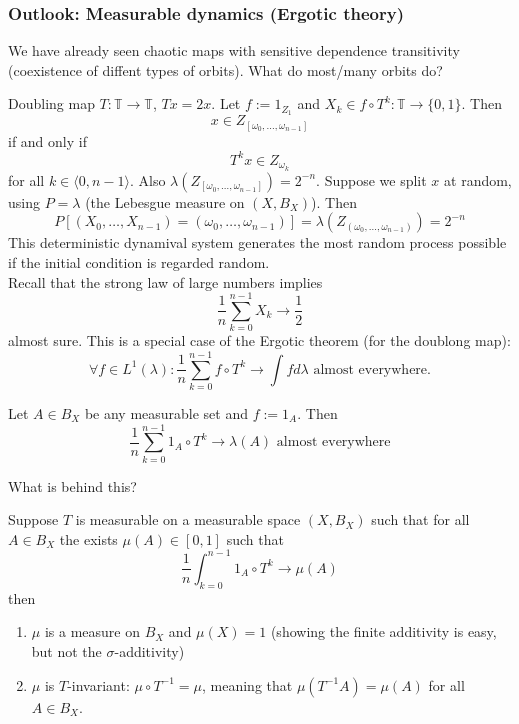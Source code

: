 \documentclass{article}
\newcommand*{\T}{\mathbb{T}}
\newcommand*{\half}[1]{\frac{#1}{2}}
\newcommand*{\jbr}[1]{{\langle #1 \rangle}}
\newcommand*{\og}{\omega}
\newcommand*{\reci}[1]{{\frac{1}{#1}}}
\begin{document}
\subsubsection{Outlook: Measurable dynamics (Ergotic theory)}

We have already seen chaotic maps with sensitive dependence transitivity (coexistence of diffent types of orbits). What do most/many orbits do?

\begin{exam}
    Doubling map $T:\T\to\T$, $Tx = 2x$. Let $f:= 1_{Z_1}$ and $X_k \in f\circ T^k:\T\to\{0,1\}$. Then
    $$x \in Z_{[\og_0,\dots,\og_{n-1}]}$$
    if and only if
    $$T^kx\in Z_{\og_k}$$
    for all $k \in\jbr{0,n-1}$. Also $\lambda(Z_{[\omega_0,\dots,\og_{n-1}]})=2^{-n}$. Suppose we split $x$ at random, using $P = \lambda$ (the Lebesgue measure on $(X, B_X)$). Then
    $$P[(X_0,\dots,X_{n-1})=(\og_0,\dots,\omega_{n-1})]=\lambda(Z_{(\og_0,\dots,\og_{n-1})})=2^{-n}$$
    This deterministic dynamival system generates the most random process possible if the initial condition is regarded random.\\
    Recall that the strong law of large numbers implies
    $$\reci n\sum_{k=0}^{n-1}X_k \to \half1$$
    almost sure. This is a special case of the Ergotic theorem (for the doublong map):
    $$\forall f \in L^1(\lambda): \reci n\sum_{k=0}^{n-1}f\circ T^k \to \int fd\lambda \text{ almost everywhere}.$$
\end{exam}

\begin{thm}
    Let $A \in B_X$ be any measurable set and $f:=1_A$. Then
    $$\reci n\sum_{k=0}^{n-1}1_A\circ T^k \to\lambda(A) \text{ almost everywhere}$$
\end{thm}

What is behind this?
\begin{thm}
    Suppose $T$ is measurable on a measurable space $(X,B_X)$ such that for all $A\in B_X$ the exists $\mu(A) \in[0,1]$ such that
    $$\reci n\int_{k=0}^{n-1}1_A\circ T^k \to \mu(A)$$
    then
    \begin{enumerate}
        \item $\mu$ is a measure on $B_X$ and $\mu(X)=1$ (showing the finite additivity is easy, but not the $\sigma$-additivity)

        \item $\mu$ is $T$-invariant: $\mu\circ T^{-1}=\mu$, meaning that $\mu(T^{-1}A)=\mu(A)$ for all $A\in B_X$.
    \end{enumerate}
\end{thm}
\end{document}
